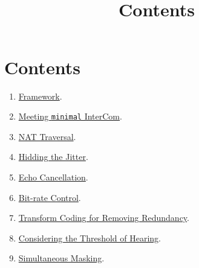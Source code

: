 

\title{\TM{}\\Contents}

\maketitle

\section*{Contents}

\begin{enumerate}
\item \href{https://tecnologias-multimedia.github.io/contents/framework/}{Framework}.
\item \href{https://tecnologias-multimedia.github.io/contents/minimal/}{Meeting \texttt{minimal} InterCom}.
\item \href{https://tecnologias-multimedia.github.io/contents/NAT_traversal/}{NAT Traversal}.
\item \href{https://tecnologias-multimedia.github.io/contents/jitter/}{Hidding the Jitter}.
\item \href{https://tecnologias-multimedia.github.io/contents/echo_cancellation/}{Echo Cancellation}.
\item \href{https://tecnologias-multimedia.github.io/contents/BR_control/}{Bit-rate Control}.
\item \href{https://tecnologias-multimedia.github.io/contents/transform_coding/}{Transform Coding for Removing Redundancy}.
\item \href{https://tecnologias-multimedia.github.io/contents/threshold_of_hearing/}{Considering the Threshold of Hearing}.
\item \href{https://tecnologias-multimedia.github.io/contents/simultaneous_masking/}{Simultaneous Masking}.
\end{enumerate}


%
